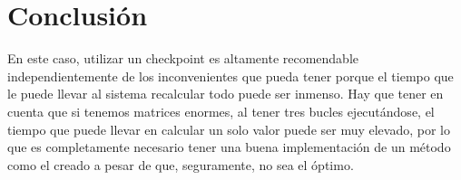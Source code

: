 \documentclass[a4paper]{article}
\begin{document}
\newpage

\section{Conclusión}

	En este caso, utilizar un checkpoint es altamente recomendable independientemente de los inconvenientes que pueda tener porque el tiempo que le puede llevar al sistema recalcular todo puede ser inmenso. Hay que tener en cuenta que si tenemos matrices enormes, al tener tres bucles ejecutándose, el tiempo que puede llevar en calcular un solo valor puede ser muy elevado, por lo que es completamente necesario tener una buena implementación de un método como el creado a pesar de que, seguramente, no sea el óptimo.
\end{document}
